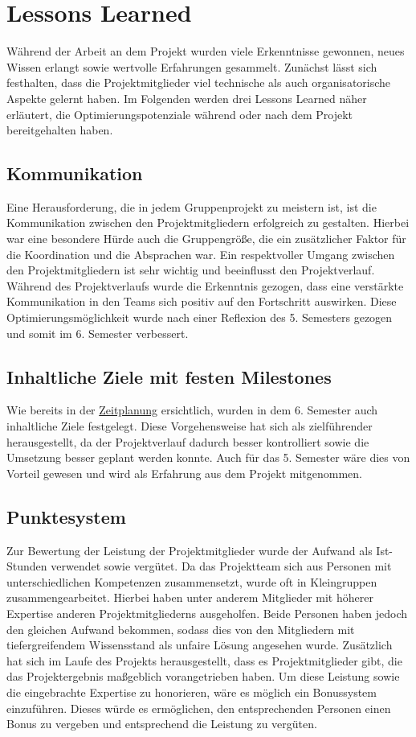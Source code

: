 \section{Lessons Learned}
Während der Arbeit an dem Projekt wurden viele Erkenntnisse gewonnen, neues Wissen erlangt sowie wertvolle Erfahrungen gesammelt.
Zunächst lässt sich festhalten, dass die Projektmitglieder viel technische als auch organisatorische Aspekte gelernt haben.
Im Folgenden werden drei Lessons Learned näher erläutert, die Optimierungspotenziale während oder nach dem Projekt bereitgehalten haben.
\subsection{Kommunikation}
Eine Herausforderung, die in jedem Gruppenprojekt zu meistern ist, ist die Kommunikation zwischen den Projektmitgliedern erfolgreich zu gestalten. 
Hierbei war eine besondere Hürde auch die Gruppengröße, die ein zusätzlicher Faktor für die Koordination und die Absprachen war. 
Ein respektvoller Umgang zwischen den Projektmitgliedern ist sehr wichtig und beeinflusst den Projektverlauf.
Während des Projektverlaufs wurde die Erkenntnis gezogen, dass eine verstärkte Kommunikation in den Teams sich positiv auf den Fortschritt auswirken. 
Diese Optimierungsmöglichkeit wurde nach einer Reflexion des 5. Semesters gezogen und somit im 6. Semester verbessert. 

\subsection{Inhaltliche Ziele mit festen Milestones}
Wie bereits in der \hyperref[ch:zeitplanung]{Zeitplanung} ersichtlich, wurden in dem 6. Semester auch inhaltliche Ziele festgelegt. 
Diese Vorgehensweise hat sich als zielführender herausgestellt, da der Projektverlauf dadurch besser kontrolliert sowie die Umsetzung besser geplant werden konnte.
Auch für das 5. Semester wäre dies von Vorteil gewesen und wird als Erfahrung aus dem Projekt mitgenommen.

\subsection{Punktesystem}
Zur Bewertung der Leistung der Projektmitglieder wurde der Aufwand als Ist-Stunden verwendet sowie vergütet.
Da das Projektteam sich aus Personen mit unterschiedlichen Kompetenzen zusammensetzt, wurde oft in Kleingruppen zusammengearbeitet. 
Hierbei haben unter anderem Mitglieder mit höherer Expertise anderen Projektmitgliederns ausgeholfen.
Beide Personen haben jedoch den gleichen Aufwand bekommen, sodass dies von den Mitgliedern mit tiefergreifendem Wissensstand als unfaire Lösung angesehen wurde. 
Zusätzlich hat sich im Laufe des Projekts herausgestellt, dass es Projektmitglieder gibt, die das Projektergebnis maßgeblich vorangetrieben haben.
Um diese Leistung sowie die eingebrachte Expertise zu honorieren, wäre es möglich ein Bonussystem einzuführen. 
Dieses würde es ermöglichen, den entsprechenden Personen einen Bonus zu vergeben und entsprechend die Leistung zu vergüten.